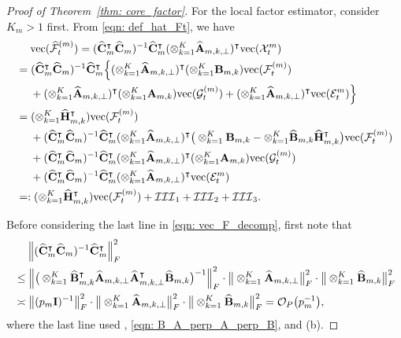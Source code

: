 \documentclass[aos]{imsart}
\theoremstyle{plain}
\theoremstyle{definition}
\def\wh#1{\widehat{#1}}
\def\cE{\mathcal{E}}
\def\cF{\mathcal{F}}
\def\cG{\mathcal{G}} \def\cH{\boldsymbol{\mathcal{H}}} \def\cI{\mathcal{I}}
\def\cIII{\mathcal{III}}
\def\cO{\mathcal{O}}
\def\cX{\mathcal{X}}
\def\bI{\mathbf{I}}
\def\bA{\mathbf{A}}
\def\bB{\mathbf{B}}
\def\bC{\mathbf{C}}
\def\bH{\mathbf{H}}
\def\trans{\intercal}
\def\vec{\mathrm{vec}}
\begin{document}
\begin{proof}[Proof of Theorem~\ref{thm: core_factor}]
For the local factor estimator, consider $K_m> 1$ first. From \eqref{eqn: def_hat_Ft}, we have
\begin{align}
    &\;\quad
    \vec(\wh{\cF}_t^{(m)}) = (\wh{\bC}_m^\trans \wh{\bC}_m)^{-1} \wh{\bC}_m^\trans (\otimes_{k=1}^K \wh{\bA}_{m,k,\perp})^\trans \vec(\cX_t^{m}) \notag \\
    &=
    (\wh{\bC}_m^\trans \wh{\bC}_m)^{-1} \wh{\bC}_m^\trans \Big\{ (\otimes_{k=1}^K \wh{\bA}_{m,k,\perp})^\trans (\otimes_{k=1}^K \bB_{m,k}) \vec(\cF_t^{(m)}) \notag \\
    &\;\quad
    + (\otimes_{k=1}^K \wh{\bA}_{m,k,\perp})^\trans (\otimes_{k=1}^K \bA_{m,k}) \vec(\cG_t^{(m)}) + (\otimes_{k=1}^K \wh{\bA}_{m,k,\perp})^\trans \vec(\cE_t^{m}) \Big\} \notag \\
    &=
    (\otimes_{k=1}^K \wh{\bH}_{m,k}^\trans) \vec(\cF_t^{(m)}) \notag \\
    &\;\quad
    + (\wh{\bC}_m^\trans \wh{\bC}_m)^{-1} \wh{\bC}_m^\trans (\otimes_{k=1}^K \wh{\bA}_{m,k,\perp})^\trans \big( \otimes_{k=1}^K \bB_{m,k} - \otimes_{k=1}^K \wh{\bB}_{m,k} \wh{\bH}_{m,k}^\trans \big) \vec(\cF_t^{(m)}) \notag \\
    &\;\quad
    + (\wh{\bC}_m^\trans \wh{\bC}_m)^{-1} \wh{\bC}_m^\trans (\otimes_{k=1}^K \wh{\bA}_{m,k,\perp})^\trans (\otimes_{k=1}^K \bA_{m,k}) \vec(\cG_t^{(m)}) \notag \\
    &\;\quad
    + (\wh{\bC}_m^\trans \wh{\bC}_m)^{-1} \wh{\bC}_m^\trans (\otimes_{k=1}^K \wh{\bA}_{m,k,\perp})^\trans \vec(\cE_t^{m}) \notag \\
    &=: (\otimes_{k=1}^K \wh{\bH}_{m,k}^\trans) \vec(\cF_t^{(m)}) + \cIII_1 + \cIII_2 + \cIII_3 .
    \label{eqn: vec_F_decomp}
\end{align}


Before considering the last line in \eqref{eqn: vec_F_decomp}, first note that
\begin{align}
    &\;\quad
    \Big\| (\wh{\bC}_m^\trans \wh{\bC}_m)^{-1} \wh{\bC}_m^\trans \Big\|_F^2 \notag \\
    &\leq
    \Big\| \big( \otimes_{k=1}^K \wh{\bB}_{m,k}^\trans \wh{\bA}_{m,k,\perp} \wh{\bA}_{m,k,\perp}^\trans \wh{\bB}_{m,k} \big)^{-1} \Big\|_F^2 \cdot \big\| \otimes_{k=1}^K \wh{\bA}_{m,k,\perp} \big\|_F^2 \cdot \big\| \otimes_{k=1}^K \wh{\bB}_{m,k} \big\|_F^2 \notag \\
    &\asymp
    \big\| (p_m \bI)^{-1} \big\|_F^2 \cdot \big\| \otimes_{k=1}^K \wh{\bA}_{m,k,\perp} \big\|_F^2 \cdot \big\| \otimes_{k=1}^K \wh{\bB}_{m,k} \big\|_F^2
    = \cO_P\big( p_m^{-1} \big) ,
    \label{eqn: CCC_rate}
\end{align}
where the last line used , \eqref{eqn: B_A_perp_A_perp_B}, and (b).


\end{proof}
\end{document}
